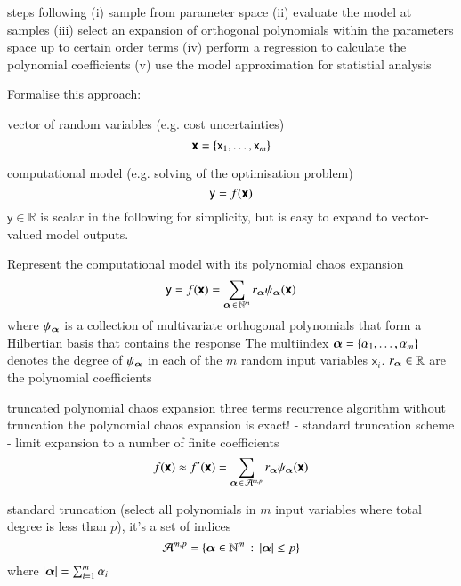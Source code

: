   
steps following \cite{feinberg_chaospy_2015}
(i) sample from parameter space
(ii) evaluate the model at samples
(iii) select an expansion of orthogonal polynomials within the parameters space up to certain order terms
(iv) perform a regression to calculate the polynomial coefficients
(v) use the model approximation for statistial analysis
  
Formalise this approach:

vector of random variables (e.g. cost uncertainties)
\begin{equation}
    \boldsymbol{\mathsf{x}} = \{\mathsf{x}_1, \dots , \mathsf{x}_m\}
\end{equation}

computational model (e.g. solving of the optimisation problem)
\begin{equation}
    \mathsf{y} = f(\boldsymbol{\mathsf{x}})
\end{equation}
$\mathsf{y}\in\mathbb{R}$ is scalar in the following for simplicity,
but is easy to expand to vector-valued model outputs.

Represent the computational model with its polynomial chaos expansion
\begin{equation}
    \mathsf{y} = f(\boldsymbol{\mathsf{x}}) = \sum_{{\bm{\alpha}} \,\in\, \mathbb{N}^m} r_{{\bm{\alpha}}} \psi_{{\bm{\alpha}}}(\boldsymbol{\mathsf{x}})
\end{equation}
where $\psi_{\bm{\alpha}}$ is a collection of multivariate orthogonal polynomials that form
a Hilbertian basis that contains the response \cite{sudret_global_2008}
The multiindex ${\bm{\alpha}} = \{\alpha_1,\dots,\alpha_m\}$ 
denotes the degree of $\psi_{\bm{\alpha}}$ in each of the $m$ random input variables $\mathsf{x}_i$.
$r_{\bm{\alpha}} \in \mathbb{R}$ are the polynomial coefficients 

truncated polynomial chaos expansion
three terms recurrence algorithm \cite{feinberg_chaospy_2015}
without truncation the polynomial chaos expansion is exact! \cite{fajraoui_optimal_2017}
- standard truncation scheme \cite{gratiet_metamodel-based_2015,sudret_global_2008}
- limit expansion to a number of finite coefficients
\begin{equation}
    f(\boldsymbol{\mathsf{x}}) \approx f'(\boldsymbol{\mathsf{x}}) = \sum_{{\bm{\alpha}} \,\in\, \mathcal{A}^{m,p}} r_{\bm{\alpha}} \psi_{\bm{\alpha}}(\boldsymbol{\mathsf{x}})
\end{equation}

standard truncation (select all polynomials in $m$ input variables where total degree is less than $p$), it's a set of indices
\begin{equation}
    \mathcal{A}^{m,p} = \left\{{\bm{\alpha}} \in \mathbb{N}^m \,:\, \left|{\bm{\alpha}}\right| \leq p\right\}
\end{equation}
where $\left|{\bm{\alpha}}\right| = \sum_{i=1}^m \alpha_i$

